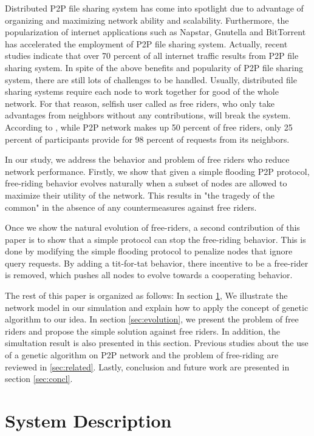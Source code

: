 \documentclass[12pt,journal,draftcls,letterpaper,onecolumn]{IEEEtran}
\begin{document}
Distributed P2P file sharing system has come into spotlight due to advantage of organizing
and maximizing network ability and scalability. Furthermore, the popularization of internet
applications such as Napstar\cite{napster}, Gnutella\cite{gnutella} and BitTorrent\cite{bittorrent} has accelerated the
employment of P2P file sharing system. Actually, recent studies indicate that over
70 percent of all internet traffic results from P2P file sharing system. In spite of the above benefits
and popularity of P2P file sharing system, there are still lots of challenges to be handled.
Usually, distributed file sharing systems require each node to work together for good of the
whole network. For that reason, selfish user called as free riders, who only take advantages
from neighbors without any contributions, will break the system. According to \cite{journals/dsonline/HughesCW05}, while P2P
network makes up 50 percent of free riders, only 25 percent of participants provide for 98
percent of requests from its neighbors.

In our study, we address the behavior and problem of free riders who reduce network
performance. Firstly, we show that given a simple flooding P2P protocol,
free-riding behavior evolves naturally when a subset of nodes are allowed to
maximize their utility of the network.  
This results in "the tragedy of the common\cite{tc:tragedy}" in the absence of
any countermeasures against free riders.

Once we show the natural evolution of free-riders, a second
contribution of this paper is to show that a simple protocol can stop the
free-riding behavior.  This is done by modifying the simple flooding protocol
to penalize nodes that ignore query requests.  By adding a tit-for-tat
behavior, there incentive to be a free-rider is removed, which pushes all
nodes to evolve towards a cooperating behavior.

The rest of this paper is organized as follows: In section \ref{sec:system}, We illustrate the network model 
in our simulation and explain how to apply the concept of genetic algorithm to our idea. In section \ref{sec:evolution}, 
we present the problem of free riders and propose the simple solution against free riders. In addition,
the simultation result is also presented in this section. Previous studies about the use of a genetic algorithm 
on P2P network and the problem of free-riding are reviewed in \ref{sec:related}. Lastly, conclusion and future work 
are presented in section \ref{sec:concl}.

\section{System Description}\label{sec:system}
\end{document}
